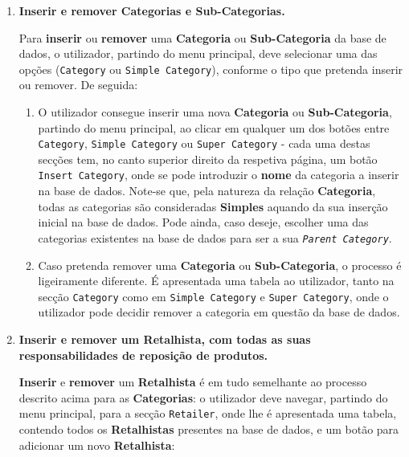 \documentclass[12pt,a4paper]{article}
\begin{document}
\begin{enumerate}
  \item \textbf{Inserir e remover Categorias e Sub-Categorias.}

        Para \textbf{inserir} ou \textbf{remover} uma \textbf{Categoria} ou \textbf{Sub-Categoria}
        da base de dados, o utilizador, partindo do menu principal, deve selecionar
        uma das opções (\texttt{Category} ou \texttt{Simple Category}), conforme o tipo
        que pretenda inserir ou remover. De seguida:

        \begin{enumerate}
          \item O utilizador consegue inserir uma nova \textbf{Categoria} ou \textbf{Sub-Categoria}, partindo
                do menu principal, ao clicar em qualquer um dos botões entre \texttt{Category},
                \texttt{Simple Category} ou \texttt{Super Category} - cada uma destas secções
                tem, no canto superior direito da respetiva página, um botão \texttt{Insert Category}, onde se pode
                introduzir o \textbf{nome} da categoria a inserir na base de dados. Note-se que,
                pela natureza da relação \textbf{Categoria}, todas as categorias são consideradas
                \textbf{Simples} aquando da sua inserção inicial na base de dados. Pode ainda, caso deseje,
                escolher uma das categorias existentes na base de dados para ser a sua
                \textit{\texttt{Parent Category}}.

          \item Caso pretenda remover uma \textbf{Categoria} ou \textbf{Sub-Categoria},
                o processo é ligeiramente diferente. É apresentada uma tabela ao utilizador,
                tanto na secção \texttt{Category} como em \texttt{Simple Category} e \texttt{Super Category}, onde o utilizador
                pode decidir remover a categoria em questão da base de dados.
        \end{enumerate}

  \item \textbf{Inserir e remover um Retalhista, com todas as suas responsabilidades
          de reposição de produtos.}

        \textbf{Inserir} e \textbf{remover} um \textbf{Retalhista} é em tudo semelhante ao processo
        descrito acima para as \textbf{Categorias}: o utilizador deve navegar,
        partindo do menu principal, para a secção \texttt{Retailer}, onde lhe é
        apresentada uma tabela, contendo todos os \textbf{Retalhistas} presentes na
        base de dados, e um botão para adicionar um novo \textbf{Retalhista}:


\end{enumerate}
\end{document}
